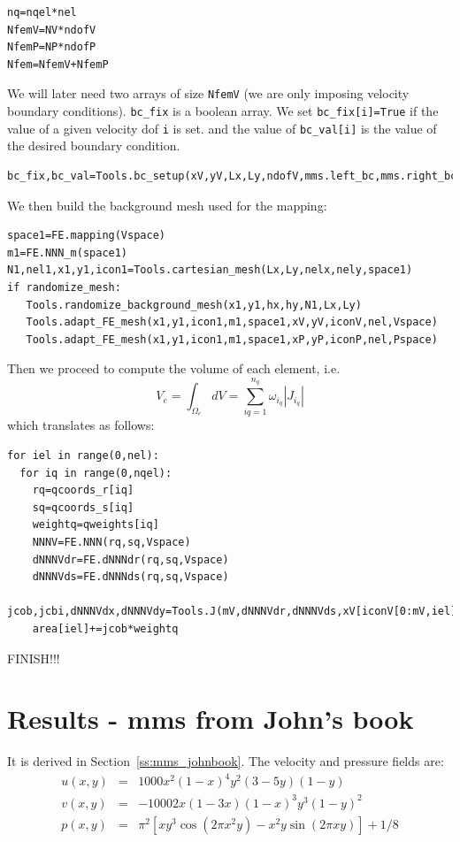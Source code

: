\begin{lstlisting}
nq=nqel*nel
NfemV=NV*ndofV
NfemP=NP*ndofP
Nfem=NfemV+NfemP
\end{lstlisting}

We will later need two arrays of size \lstinline{NfemV} (we are only imposing
velocity boundary conditions). \lstinline{bc_fix} is a boolean array.
We set \lstinline{bc_fix[i]=True} if the value of a given velocity dof \lstinline{i} is set. 
and the value of \lstinline{bc_val[i]} is the value of the desired boundary condition.

\begin{lstlisting}
bc_fix,bc_val=Tools.bc_setup(xV,yV,Lx,Ly,ndofV,mms.left_bc,mms.right_bc,mms.bottom_bc,mms.top_bc)
\end{lstlisting}

We then build the background mesh used for the mapping:
\begin{lstlisting}
space1=FE.mapping(Vspace)
m1=FE.NNN_m(space1)
N1,nel1,x1,y1,icon1=Tools.cartesian_mesh(Lx,Ly,nelx,nely,space1)
if randomize_mesh:
   Tools.randomize_background_mesh(x1,y1,hx,hy,N1,Lx,Ly)
   Tools.adapt_FE_mesh(x1,y1,icon1,m1,space1,xV,yV,iconV,nel,Vspace)
   Tools.adapt_FE_mesh(x1,y1,icon1,m1,space1,xP,yP,iconP,nel,Pspace)
\end{lstlisting}




Then we proceed to compute the volume of each element, i.e. 
\[
V_e = \int_{\Omega_e} dV = \sum_{iq=1}^{n_q} \omega_{i_q} |J_{i_q}|
\]
which translates as follows: 
\begin{lstlisting}
for iel in range(0,nel):
  for iq in range(0,nqel):
    rq=qcoords_r[iq]
    sq=qcoords_s[iq]
    weightq=qweights[iq]
    NNNV=FE.NNN(rq,sq,Vspace)
    dNNNVdr=FE.dNNNdr(rq,sq,Vspace)
    dNNNVds=FE.dNNNds(rq,sq,Vspace)
    jcob,jcbi,dNNNVdx,dNNNVdy=Tools.J(mV,dNNNVdr,dNNNVds,xV[iconV[0:mV,iel]],yV[iconV[0:mV,iel]])
    area[iel]+=jcob*weightq
\end{lstlisting}

FINISH!!!


\newpage
\section*{Results - mms from John's book}

It is derived in Section~\ref{ss:mms_johnbook}. The velocity and pressure fields are:
\begin{eqnarray}
u(x,y) &=& 1000 x^2(1-x)^4  y^2 (3-5y) (1-y) \\
v(x,y) &=& -1000 2x(1-3x) (1-x)^3  y^3(1-y)^2   \\
p(x,y) &=& \pi^2 [xy^3 \cos(2\pi x^2 y) - x^2y \sin(2\pi xy) ]+1/8
\end{eqnarray}

